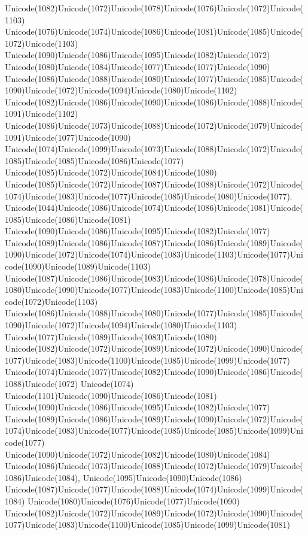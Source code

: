 \documentclass[a4paper,11pt]{report}
\begin{document}
{{Unicode(1082)Unicode(1072)Unicode(1078)Unicode(1076)Unicode(1072)Unicode(1103)
Unicode(1076)Unicode(1074)Unicode(1086)Unicode(1081)Unicode(1085)Unicode(1072)Unicode(1103)
Unicode(1090)Unicode(1086)Unicode(1095)Unicode(1082)Unicode(1072)
Unicode(1080)Unicode(1084)Unicode(1077)Unicode(1077)Unicode(1090)
Unicode(1086)Unicode(1088)Unicode(1080)Unicode(1077)Unicode(1085)Unicode(1090)Unicode(1072)Unicode(1094)Unicode(1080)Unicode(1102)
Unicode(1082)Unicode(1086)Unicode(1090)Unicode(1086)Unicode(1088)Unicode(1091)Unicode(1102)
Unicode(1086)Unicode(1073)Unicode(1088)Unicode(1072)Unicode(1079)Unicode(1091)Unicode(1077)Unicode(1090)
Unicode(1074)Unicode(1099)Unicode(1073)Unicode(1088)Unicode(1072)Unicode(1085)Unicode(1085)Unicode(1086)Unicode(1077)
Unicode(1085)Unicode(1072)Unicode(1084)Unicode(1080)
Unicode(1085)Unicode(1072)Unicode(1087)Unicode(1088)Unicode(1072)Unicode(1074)Unicode(1083)Unicode(1077)Unicode(1085)Unicode(1080)Unicode(1077).  Unicode(1044)Unicode(1086)Unicode(1074)Unicode(1086)Unicode(1081)Unicode(1085)Unicode(1086)Unicode(1081)
Unicode(1090)Unicode(1086)Unicode(1095)Unicode(1082)Unicode(1077)
Unicode(1089)Unicode(1086)Unicode(1087)Unicode(1086)Unicode(1089)Unicode(1090)Unicode(1072)Unicode(1074)Unicode(1083)Unicode(1103)Unicode(1077)Unicode(1090)Unicode(1089)Unicode(1103)
Unicode(1087)Unicode(1086)Unicode(1083)Unicode(1086)Unicode(1078)Unicode(1080)Unicode(1090)Unicode(1077)Unicode(1083)Unicode(1100)Unicode(1085)Unicode(1072)Unicode(1103)
Unicode(1086)Unicode(1088)Unicode(1080)Unicode(1077)Unicode(1085)Unicode(1090)Unicode(1072)Unicode(1094)Unicode(1080)Unicode(1103)
Unicode(1077)Unicode(1089)Unicode(1083)Unicode(1080)
Unicode(1082)Unicode(1072)Unicode(1089)Unicode(1072)Unicode(1090)Unicode(1077)Unicode(1083)Unicode(1100)Unicode(1085)Unicode(1099)Unicode(1077)
Unicode(1074)Unicode(1077)Unicode(1082)Unicode(1090)Unicode(1086)Unicode(1088)Unicode(1072)
Unicode(1074) Unicode(1101)Unicode(1090)Unicode(1086)Unicode(1081)
Unicode(1090)Unicode(1086)Unicode(1095)Unicode(1082)Unicode(1077)
Unicode(1089)Unicode(1086)Unicode(1089)Unicode(1090)Unicode(1072)Unicode(1074)Unicode(1083)Unicode(1077)Unicode(1085)Unicode(1085)Unicode(1099)Unicode(1077)
Unicode(1090)Unicode(1072)Unicode(1082)Unicode(1080)Unicode(1084)
Unicode(1086)Unicode(1073)Unicode(1088)Unicode(1072)Unicode(1079)Unicode(1086)Unicode(1084),
Unicode(1095)Unicode(1090)Unicode(1086)
Unicode(1087)Unicode(1077)Unicode(1088)Unicode(1074)Unicode(1099)Unicode(1084)
Unicode(1080)Unicode(1076)Unicode(1077)Unicode(1090)
Unicode(1082)Unicode(1072)Unicode(1089)Unicode(1072)Unicode(1090)Unicode(1077)Unicode(1083)Unicode(1100)Unicode(1085)Unicode(1099)Unicode(1081)
}}
\end{document}
